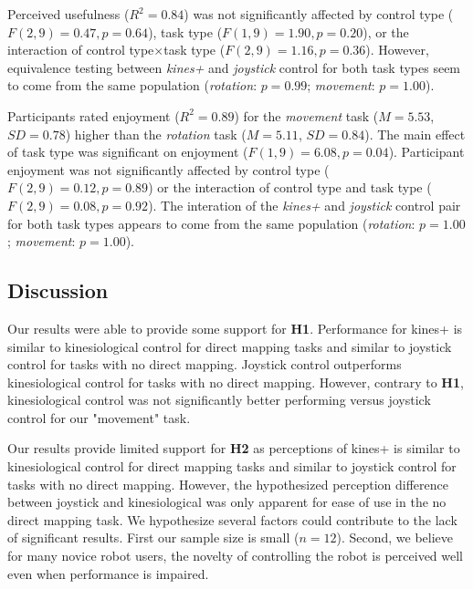 \documentclass{sigchi}
\begin{document}
Perceived usefulness ($R^{2}=0.84$) was not significantly affected by control type ($F(2, 9)=0.47, p=0.64$), task type ($F(1, 9)=1.90, p=0.20$), or the interaction of control type$\times$task type  ($F(2, 9)=1.16, p=0.36$). 
However, equivalence testing between \textit{kines+} and \textit{joystick} control for both task types seem to come from the same population (\textit{rotation}: $p=0.99$; \textit{movement}: $p=1.00$).

Participants rated enjoyment ($R^{2}=0.89$) for the \textit{movement} task ($M=5.53$, $SD=0.78$) higher than the \textit{rotation} task ($M=5.11$, $SD=0.84$). The main effect of task type was significant on enjoyment ($F(1, 9)=6.08, p=0.04$). Participant enjoyment was not significantly affected by control type ($F(2, 9)=0.12, p=0.89$) or the interaction of control type and task type  ($F(2, 9)=0.08, p=0.92$). The interation of the \textit{kines+} and \textit{joystick} control pair for both task types appears to come from the same population (\textit{rotation}: $p=1.00$; \textit{movement}: $p=1.00$).

\subsection{Discussion}

Our results were able to provide some support for \textbf{H1}. Performance for kines+ is similar to kinesiological control for direct mapping tasks and similar to joystick control for tasks with no direct mapping. Joystick control outperforms kinesiological control for tasks with no direct mapping. However, contrary to \textbf{H1}, kinesiological control was not significantly better performing versus joystick control for our "movement" task.%

Our results provide limited support for \textbf{H2} as perceptions of kines+ is similar to kinesiological control for direct mapping tasks and similar to joystick control for tasks with no direct mapping. However, the hypothesized perception difference between joystick and kinesiological was only apparent for ease of use in the no direct mapping task. We hypothesize several factors could contribute to the lack of significant results. First our sample size is small ($n=12$). Second, we believe for many novice robot users, the novelty of controlling the robot is perceived well even when performance is impaired.
\end{document}
